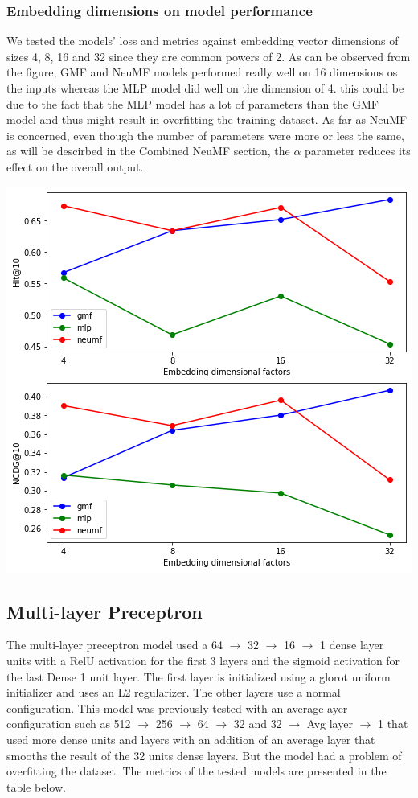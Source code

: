 \documentclass{article}
\begin{document}
\subsubsection{Embedding dimensions on model performance}
We tested the models' loss and metrics against embedding vector dimensions of sizes 4, 8, 16 and 32 since they are common powers of 2. As can be observed from the figure, GMF and NeuMF models performed really well on 16 dimensions os the inputs whereas the MLP model did well on the dimension of 4. this could be due to the fact that the MLP model has a lot of parameters than the GMF model and thus might result in overfitting the training dataset. As far as NeuMF is concerned, even though the number of parameters were more or less the same, as will be descirbed in the Combined NeuMF section, the $\alpha$ parameter reduces its effect on the overall output.
\begin{center}
\includegraphics[scale=0.5]{factors}
\end{center}

\subsection{Multi-layer Preceptron}
The multi-layer preceptron model used a 64 $\rightarrow$ 32 $\rightarrow$ 16 $\rightarrow$ 1 dense layer units with a RelU activation for the first 3 layers and the sigmoid activation for the last Dense 1 unit layer. The first layer is initialized using a glorot uniform initializer and uses an L2 regularizer. The other layers use a normal configuration. This model was previously tested with an average ayer configuration such as 512 $\rightarrow$ 256 $\rightarrow$ 64 $\rightarrow$ 32 and 32 $\rightarrow$ Avg layer $\rightarrow$ 1 that used more dense units and layers with an addition of an average layer that smooths the result of the 32 units dense layers. But the model had a problem of overfitting the dataset. The metrics of the tested models are presented in the table below.
\end{document}
